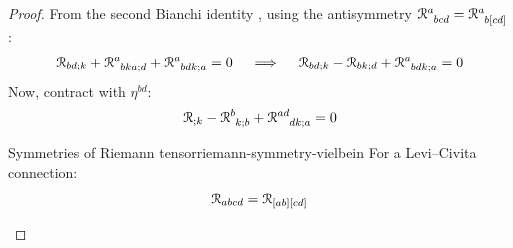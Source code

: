 \begin{proofbox}
  \begin{proof}
    From the second Bianchi identity , using the antisymmetry $ \tensor{\rr}{^a_{bcd}} = \tensor{\rr}{^a_{b[cd]}} $:
    \begin{equation*}
      \rr_{bd;k} + \tensor{\rr}{^a_{bka;d}} + \tensor{\rr}{^a_{bdk;a}} = 0
      \quad \implies \quad
      \rr_{bd;k} - \rr_{bk;d} + \tensor{\rr}{^a_{bdk;a}} = 0
    \end{equation*}
    Now, contract with $ \eta^{bd} $:
    \begin{equation*}
      \rr_{;k} - \tensor{\rr}{^b_{k;b}} + \tensor{\rr}{^{ad}_{dk;a}} = 0
    \end{equation*}

    \begin{lemma}{Symmetries of Riemann tensor}{riemann-symmetry-vielbein}
      For a Levi--Civita connection:
      \begin{equation}
        \EuScript{R}_{abcd} = \EuScript{R}_{[ab][cd]}
      \end{equation}
    \end{lemma}


\end{proof}
\end{proofbox}
